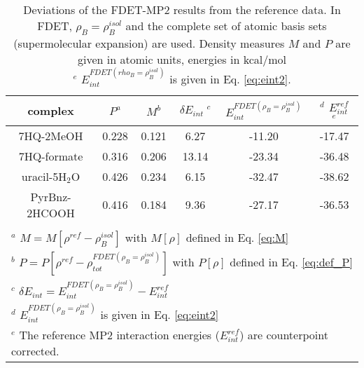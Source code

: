 \documentclass[journal=jctcce,manuscript=article]{achemso}
\begin{document}
\begin{table*}
{
\begin{center}
\begin{tabular}{|c|c|c|c|c|c|}
\hline
 complex & $P^a$ & $M^b$ & $\delta E_{int}\;^c$&$E^{FDET(\rho_B=\rho_B^{isol})}_{int}$ &$^d$ $E_{int}^{ref}$ $^e$ \\ \hline
7HQ-2MeOH &0.228& 0.121 & 6.27 &-11.20 & -17.47 \\ \hline
7HQ-formate &0.316& 0.206 &  13.14&-23.34 & -36.48 \\ \hline
uracil-5H$_2$O &0.426&  0.234 & 6.15&-32.47 & -38.62 \\ \hline
PyrBnz-2HCOOH  &0.416& 0.184 & 9.36&-27.17 &  -36.53 \\ \hline
\multicolumn{6}{c}{ } \\
\multicolumn{6}{l}{$^a$ $M=M[\rho^{ref} - \rho^{isol}_{B}]$ with $M[\rho]$ defined in Eq. \ref{eq:M}}\\
\multicolumn{6}{l}{$^b$ $P=P[\rho^{ref} - \rho_{tot}^{FDET(\rho_B=\rho_B^{isol})}]$ with $P[\rho]$ defined in Eq. \ref{eq:def_P}}\\
\multicolumn{6}{l}{$^c$ $\delta E_{int}=E^{FDET(\rho_B=\rho_B^{isol})}_{int}-E_{int}^{ref}$} \\
\multicolumn{6}{l}{$^d$ $E^{FDET(\rho_B=\rho_B^{isol})}_{int}$ is given in Eq. \ref{eq:eint2}}\\
\multicolumn{6}{l}{$^e$ The reference MP2 interaction energies ($E_{int}^{ref}$) are counterpoint corrected.}
\end{tabular}
\end{center}
}%
\caption{Deviations of the FDET-MP2 results from the reference data.  In FDET, $\rho_B=\rho_B^{isol}$  and the complete set of atomic basis sets (supermolecular  expansion) are used. 
Density measures $M$ and $P$ are given in atomic units, energies in kcal/mol\\
$^e$ $E^{FDET(rho_B=\rho_B^{isol})}_{int}$ is given in Eq. \ref{eq:eint2}.
}
\label{table:SE_isol}
\end{table*}
\end{document}
